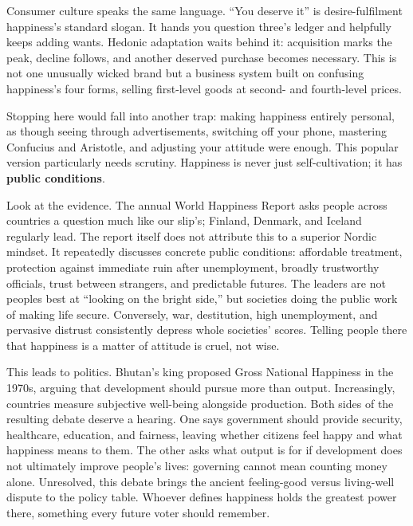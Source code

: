 Consumer culture speaks the same language. ``You deserve it'' is desire-fulfilment happiness's standard slogan. It hands you question three's ledger and helpfully keeps adding wants. Hedonic adaptation waits behind it: acquisition marks the peak, decline follows, and another deserved purchase becomes necessary. This is not one unusually wicked brand but a business system built on confusing happiness's four forms, selling first-level goods at second- and fourth-level prices.

Stopping here would fall into another trap: making happiness entirely personal, as though seeing through advertisements, switching off your phone, mastering Confucius and Aristotle, and adjusting your attitude were enough. This popular version particularly needs scrutiny. Happiness is never just self-cultivation; it has \textbf{public conditions}.

Look at the evidence. The annual World Happiness Report asks people across countries a question much like our slip's; Finland, Denmark, and Iceland regularly lead. The report itself does not attribute this to a superior Nordic mindset. It repeatedly discusses concrete public conditions: affordable treatment, protection against immediate ruin after unemployment, broadly trustworthy officials, trust between strangers, and predictable futures. The leaders are not peoples best at ``looking on the bright side,'' but societies doing the public work of making life secure. Conversely, war, destitution, high unemployment, and pervasive distrust consistently depress whole societies' scores. Telling people there that happiness is a matter of attitude is cruel, not wise.

This leads to politics. Bhutan's king proposed Gross National Happiness in the 1970s, arguing that development should pursue more than output. Increasingly, countries measure subjective well-being alongside production. Both sides of the resulting debate deserve a hearing. One says government should provide security, healthcare, education, and fairness, leaving whether citizens feel happy and what happiness means to them. The other asks what output is for if development does not ultimately improve people's lives: governing cannot mean counting money alone. Unresolved, this debate brings the ancient feeling-good versus living-well dispute to the policy table. Whoever defines happiness holds the greatest power there, something every future voter should remember.

